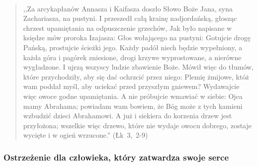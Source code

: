 \documentclass[10pt,a4paper,oneside]{article}
\begin{document}
\paragraph{}
\begin{quote}
,,Za arcykapłanów Annasza i Kaifasza doszło Słowo Boże Jana, syna Zachariasza, na pustyni. I przeszedł całą krainę nadjordańską, głosząc chrzest upamiętania na odpuszczenie grzechów, Jak było napisane w księdze mów proroka Izajasza: Głos wołającego na pustyni: Gotujcie drogę Pańską, prostujcie ścieżki jego. Każdy padół niech będzie wypełniony, a każda góra i pagórek zniesione, drogi krzywe wyprostowane, a nierówne wygładzone. I ujrzą wszyscy ludzie zbawienie Boże. Mówił więc do tłumów, które przychodziły, aby się dać ochrzcić przez niego: Plemię żmijowe, któż wam poddał myśl, aby uciekać przed przyszłym gniewem? Wydawajcie więc owoce godne upamiętania. A nie próbujcie wmawiać w siebie: Ojca mamy Abrahama; powiadam wam bowiem, że Bóg może z tych kamieni wzbudzić dzieci Abrahamowi. A już i siekiera do korzenia drzew jest przyłożona; wszelkie więc drzewo, które nie wydaje owocu dobrego, zostaje wycięte i w ogień wrzucone.'' \mbox{(Łk 3, 2-9)}
\end{quote}
\subsubsection{Ostrzeżenie dla człowieka, który zatwardza swoje serce}
\end{document}
